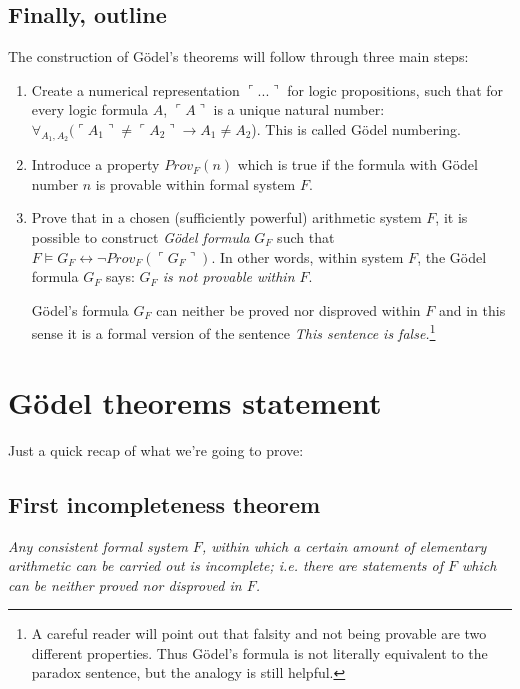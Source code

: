 \documentclass{article}
\begin{document}
\subsection{Finally, outline}

The construction of Gödel's theorems will follow through three main steps:

\begin{enumerate}
    \item Create a numerical representation $\ulcorner ... \urcorner$ for logic propositions,
        such that for every logic formula $A$, $\ulcorner A \urcorner$ is a unique natural number:
        $\forall_{A_1, A_2} (\ulcorner A_1 \urcorner \neq \ulcorner A_2 \urcorner
        \rightarrow A_1 \neq A_2$). This is called Gödel numbering.
    \item Introduce a property $Prov_F(n)$ which is true if the formula with Gödel number $n$
        is provable within formal system $F$.
    \item Prove that in a chosen (sufficiently powerful) arithmetic system $F$,
        it is possible to construct \textit{Gödel formula} $G_F$ such that
        $F \models G_F \leftrightarrow \neg Prov_F(\ulcorner G_F \urcorner)$. In other words, within system
        $F$, the Gödel formula $G_F$ says: \textit{$G_F$ is not provable within $F$}.

        Gödel's formula $G_F$ can neither be proved nor disproved within $F$ and in this
        sense it is a formal version of the sentence \textit{This sentence is false.}\footnote{
            A careful reader will point out that falsity and not being provable are two different
            properties. Thus Gödel's formula is not literally equivalent to the
            paradox sentence, but the analogy is still helpful.
        }
\end{enumerate}

\section{Gödel theorems statement}

Just a quick recap of what we're going to prove:

\subsection{First incompleteness theorem}

\textit{Any consistent formal system $F$, within which a certain amount of elementary
arithmetic can be carried out is incomplete; i.e. there are statements of $F$ which can be
neither proved nor disproved in $F$.}
\end{document}

